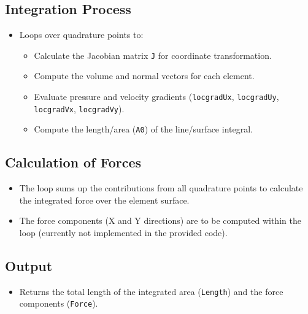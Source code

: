 \documentclass[a4paper,12pt]{article} %
\begin{document}
\subsection*{Integration Process}
\begin{itemize}
    \item Loops over quadrature points to:
    \begin{itemize}
        \item Calculate the Jacobian matrix \texttt{J} for coordinate transformation.
        \item Compute the volume and normal vectors for each element.
        \item Evaluate pressure and velocity gradients (\texttt{locgradUx}, \texttt{locgradUy}, \texttt{locgradVx}, \texttt{locgradVy}).
        \item Compute the length/area (\texttt{A0}) of the line/surface integral.
    \end{itemize}
\end{itemize}

\subsection*{Calculation of Forces}
\begin{itemize}
    \item The loop sums up the contributions from all quadrature points to calculate the integrated force over the element surface.
    \item The force components (X and Y directions) are to be computed within the loop (currently not implemented in the provided code).
\end{itemize}

\subsection*{Output}
\begin{itemize}
    \item Returns the total length of the integrated area (\texttt{Length}) and the force components (\texttt{Force}).
\end{itemize}
\end{document}
